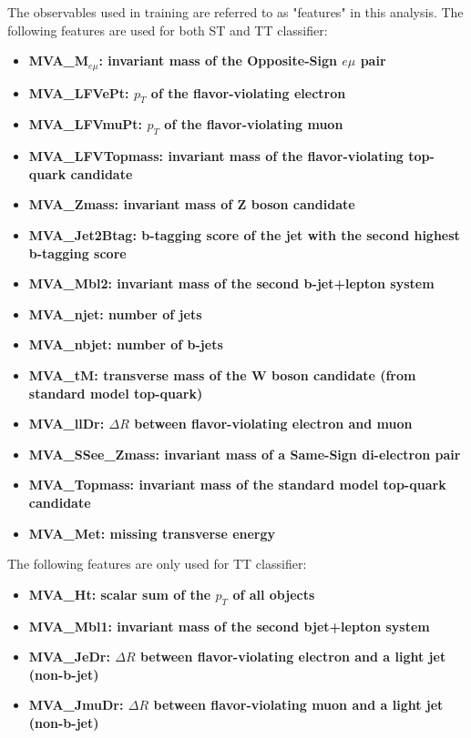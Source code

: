 The observables used in training are referred to as "features" in this analysis. The following features are used for both ST and TT classifier:

\begin{itemize}
\item \textbf{MVA\_M$_{e\mu}$: invariant mass of the Opposite-Sign $e\mu$ pair}
\item \textbf{MVA\_LFVePt: $p_T$ of the flavor-violating electron}
\item \textbf{MVA\_LFVmuPt: $p_T$ of the flavor-violating muon}
\item \textbf{MVA\_LFVTopmass: invariant mass of the flavor-violating top-quark candidate}
\item \textbf{MVA\_Zmass: invariant mass of Z boson candidate}
\item \textbf{MVA\_Jet2Btag: b-tagging score of the jet with the second highest b-tagging score}
\item \textbf{MVA\_Mbl2: invariant mass of the second b-jet+lepton system}
\item \textbf{MVA\_njet: number of jets}
\item \textbf{MVA\_nbjet: number of b-jets}
\item \textbf{MVA\_tM: transverse mass of the W boson candidate (from standard model top-quark)}
\item \textbf{MVA\_llDr: $\Delta R$ between flavor-violating electron and muon}
\item \textbf{MVA\_SSee\_Zmass: invariant mass of a Same-Sign di-electron pair}
\item \textbf{MVA\_Topmass: invariant mass of the standard model top-quark candidate}
\item \textbf{MVA\_Met: missing transverse energy}
\end{itemize}

The following features are only used for TT classifier:

\begin{itemize}
\item \textbf{MVA\_Ht: scalar sum of the $p_T$ of all objects}
\item \textbf{MVA\_Mbl1: invariant mass of the second bjet+lepton system}
\item \textbf{MVA\_JeDr: $\Delta R$ between flavor-violating electron and a light jet (non-b-jet)}
\item \textbf{MVA\_JmuDr: $\Delta R$ between flavor-violating muon and a light jet (non-b-jet)}
\end{itemize}

